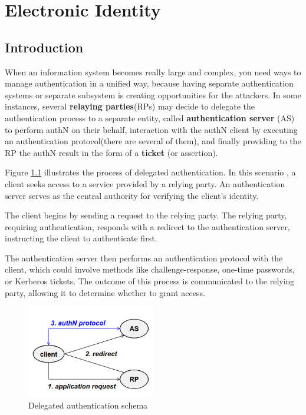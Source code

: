 \chapter{Electronic Identity}

\section{Introduction}
When an information system becomes really large and complex, you need
ways to manage authentication in a unified way, because having
separate authentication systems or separate subsystem is creating
opportunities for the attackers.
In some instances, several \textbf{relaying parties}(RPs) may decide
to delegate the authentication process to a separate entity,
called \textbf{authentication server} (AS) to perform authN on their
behalf, interaction with the authN client by executing an
authentication protocol(there are several of them), and finally
providing to the RP the authN result in the form of a \textbf{ticket}
(or assertion).

Figure \ref{fig:delegated-auth} illustrates the process of delegated
authentication. In this scenario , a client seeks access to a service
provided by a relying party. An authentication server serves as the
central authority for verifying the client’s identity.  

The client begins by sending a request to the relying party. The
relying party, requiring authentication, responds with a redirect to
the authentication server, instructing the client to authenticate
first.  

The authentication server then performs an authentication protocol
with the client, which could involve methods like challenge-response,
one-time passwords, or Kerberos tickets. The outcome of this process
is communicated to the relying party, allowing it to determine whether
to grant access.  

\begin{figure}[h]
  \centering
  \includegraphics[width=0.5\textwidth]{img/delegated auth.png}
  \caption{Delegated authentication schema}
  \label{fig:delegated-auth}
\end{figure}

